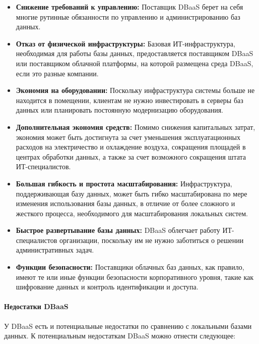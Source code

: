 \begin{itemize}
\item \textbf{Снижение требований к управлению:} Поставщик DBaaS берет на себя многие рутинные обязанности по управлению и администрированию баз данных.
\item \textbf{Отказ от физической инфраструктуры:} Базовая ИТ-инфраструктура, необходимая для работы базы данных, предоставляется поставщиком DBaaS или поставщиком облачной платформы, на которой размещена среда DBaaS, если это разные компании.
\item \textbf{Экономия на оборудовании:} Поскольку инфраструктура системы больше не находится в помещении, клиентам не нужно инвестировать в серверы баз данных или планировать постоянную модернизацию оборудования.
\item \textbf{Дополнительная экономия средств:} Помимо снижения капитальных затрат, экономия может быть достигнута за счет уменьшения эксплуатационных расходов на электричество и охлаждение воздуха, сокращения площадей в центрах обработки данных, а также за счет возможного сокращения штата ИТ-специалистов.
\item \textbf{Большая гибкость и простота масштабирования:} Инфраструктура, поддерживающая базу данных, может быть гибко масштабирована по мере изменения использования базы данных, в отличие от более сложного и жесткого процесса, необходимого для масштабирования локальных систем.
\item \textbf{Быстрое развертывание базы данных:} DBaaS облегчает работу ИТ-специалистов организации, поскольку им не нужно заботиться о решении административных задач.
\item \textbf{Функции безопасности:} Поставщики облачных баз данных, как правило, имеют те или иные функции безопасности корпоративного уровня, такие как шифрование данных и контроль идентификации и доступа.
\end{itemize}

\paragraph{Недостатки DBaaS}

У DBaaS есть и потенциальные недостатки по сравнению с локальными базами данных. К потенциальным недостаткам DBaaS можно отнести следующее:

